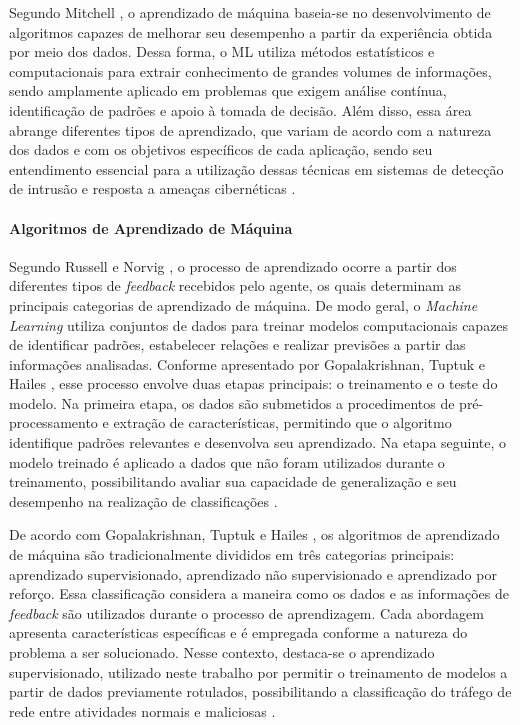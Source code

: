 \documentclass[
    12pt,                %
    openright,           %
    oneside,             %
    a4paper,             %
    english,             %
    brazil               %
]{abntex2}
\begin{document}
Segundo Mitchell \cite{mitchell1997}, o aprendizado de máquina baseia-se no desenvolvimento de algoritmos capazes de melhorar seu desempenho a partir da experiência obtida por meio dos dados. Dessa forma, o ML utiliza métodos estatísticos e computacionais para extrair conhecimento de grandes volumes de informações, sendo amplamente aplicado em problemas que exigem análise contínua, identificação de padrões e apoio à tomada de decisão. Além disso, essa área abrange diferentes tipos de aprendizado, que variam de acordo com a natureza dos dados e com os objetivos específicos de cada aplicação, sendo seu entendimento essencial para a utilização dessas técnicas em sistemas de detecção de intrusão e resposta a ameaças cibernéticas \cite{mitchell1997,russell2010}.

\paragraph{Algoritmos de Aprendizado de Máquina}

Segundo Russell e Norvig \cite{russell2010}, o processo de aprendizado ocorre a partir dos diferentes tipos de \textit{feedback} recebidos pelo agente, os quais determinam as principais categorias de aprendizado de máquina. De modo geral, o \textit{Machine Learning} utiliza conjuntos de dados para treinar modelos computacionais capazes de identificar padrões, estabelecer relações e realizar previsões a partir das informações analisadas. Conforme apresentado por Gopalakrishnan, Tuptuk e Hailes \cite{gopalakrishnan2023}, esse processo envolve duas etapas principais: o treinamento e o teste do modelo. Na primeira etapa, os dados são submetidos a procedimentos de pré-processamento e extração de características, permitindo que o algoritmo identifique padrões relevantes e desenvolva seu aprendizado. Na etapa seguinte, o modelo treinado é aplicado a dados que não foram utilizados durante o treinamento, possibilitando avaliar sua capacidade de generalização e seu desempenho na realização de classificações \cite{gopalakrishnan2023}.

De acordo com Gopalakrishnan, Tuptuk e Hailes \cite{gopalakrishnan2023}, os algoritmos de aprendizado de máquina são tradicionalmente divididos em três categorias principais: aprendizado supervisionado, aprendizado não supervisionado e aprendizado por reforço. Essa classificação considera a maneira como os dados e as informações de \textit{feedback} são utilizados durante o processo de aprendizagem. Cada abordagem apresenta características específicas e é empregada conforme a natureza do problema a ser solucionado. Nesse contexto, destaca-se o aprendizado supervisionado, utilizado neste trabalho por permitir o treinamento de modelos a partir de dados previamente rotulados, possibilitando a classificação do tráfego de rede entre atividades normais e maliciosas \cite{russell2010,gopalakrishnan2023}.
\end{document}
